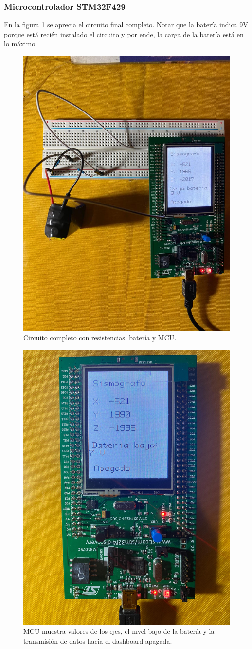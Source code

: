 \subsubsection{Microcontrolador STM32F429}

En la figura \ref{completo} se aprecia el circuito final completo. Notar que la batería indica 9V porque está recién instalado el circuito y por ende, la carga de la batería está en lo máximo. 

\begin{figure}[H]
        \centering
        \includegraphics[width=0.7\linewidth]{fotos/completo.jpeg}
        \caption{Circuito completo con resistencias, batería y MCU.}
        \label{completo}
    \end{figure}

\begin{figure}[H]
        \centering
        \includegraphics[width=0.5\linewidth]{fotos/bate_baja_apagada.jpeg}
        \caption{MCU muestra valores de los ejes, el nivel bajo de la batería y la transmisión de datos hacia el dashboard apagada.}
        \label{bate_baja_apagada}
    \end{figure}
    
